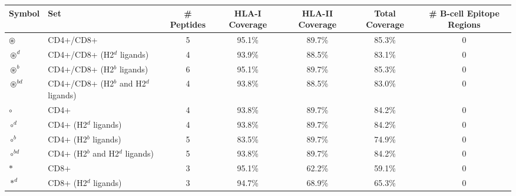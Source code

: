 \begin{tabular}{llccccc}
\toprule
                                              Symbol &                                      Set &  \# Peptides & HLA-I Coverage & HLA-II Coverage & Total Coverage &  \# B-cell Epitope Regions \\
\midrule
                                     $ \circledast $ &                                CD4+/CD8+ &            5 &         95.1\% &          89.7\% &         85.3\% &                          0 \\
                                   $ \circledast^d $ &               CD4+/CD8+ (H2$^d$ ligands) &            4 &         93.9\% &          88.5\% &         83.1\% &                          0 \\
                                   $ \circledast^b $ &               CD4+/CD8+ (H2$^b$ ligands) &            6 &         95.1\% &          89.7\% &         85.3\% &                          0 \\
                                $ \circledast^{bd} $ &    CD4+/CD8+ (H2$^b$ and H2$^d$ ligands) &            4 &         93.8\% &          88.5\% &         83.0\% &                          0 \\
                                           $ \circ $ &                                     CD4+ &            4 &         93.8\% &          89.7\% &         84.2\% &                          0 \\
                                         $ \circ^d $ &                    CD4+ (H2$^d$ ligands) &            4 &         93.8\% &          89.7\% &         84.2\% &                          0 \\
                                         $ \circ^b $ &                    CD4+ (H2$^b$ ligands) &            5 &         83.5\% &          89.7\% &         74.9\% &                          0 \\
                                      $ \circ^{bd} $ &         CD4+ (H2$^b$ and H2$^d$ ligands) &            5 &         93.8\% &          89.7\% &         84.2\% &                          0 \\
                                            $ \ast $ &                                     CD8+ &            3 &         95.1\% &          62.2\% &         59.1\% &                          0 \\
                                          $ \ast^d $ &                    CD8+ (H2$^d$ ligands) &            3 &         94.7\% &          68.9\% &         65.3\% &                          0 \\

\end{tabular}

